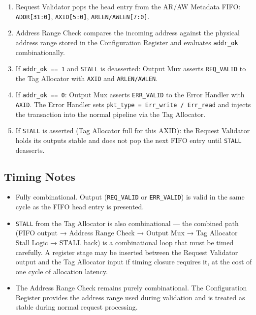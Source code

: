 \begin{enumerate}
  \item Request Validator pops the head entry from the AR/AW Metadata
        FIFO: \texttt{ADDR[31:0]}, \texttt{AXID[5:0]},
        \texttt{ARLEN/AWLEN[7:0]}.
  \item Address Range Check compares the incoming address against the physical address range stored in the Configuration Register and evaluates \texttt{addr\_ok} combinationally.
  \item If \texttt{addr\_ok == 1} and \texttt{STALL} is deasserted:
        Output Mux asserts \texttt{REQ\_VALID} to the Tag Allocator
        with \texttt{AXID} and \texttt{ARLEN/AWLEN}.
  \item If \texttt{addr\_ok == 0}: Output Mux asserts \texttt{ERR\_VALID}
        to the Error Handler with \texttt{AXID}. The Error Handler sets
        \texttt{pkt\_type = Err\_write / Err\_read} and injects the
        transaction into the normal pipeline via the Tag Allocator.
  \item If \texttt{STALL} is asserted (Tag Allocator full for this
        AXID): the Request Validator holds its outputs stable and does
        not pop the next FIFO entry until \texttt{STALL} deasserts.
\end{enumerate}

\subsection{Timing Notes}

\begin{itemize}
  \item Fully combinational. Output (\texttt{REQ\_VALID} or
        \texttt{ERR\_VALID}) is valid in the same cycle as the FIFO
        head entry is presented.
  \item \texttt{STALL} from the Tag Allocator is also combinational —
        the combined path (FIFO output → Address Range Check → Output
        Mux → Tag Allocator Stall Logic → STALL back) is a
        combinational loop that must be timed carefully. A register
        stage may be inserted between the Request Validator output and
        the Tag Allocator input if timing closure requires it, at the
        cost of one cycle of allocation latency.
  \item The Address Range Check remains purely combinational. 
        The Configuration Register provides the address range used during validation and is treated as stable during normal request processing.
\end{itemize}

